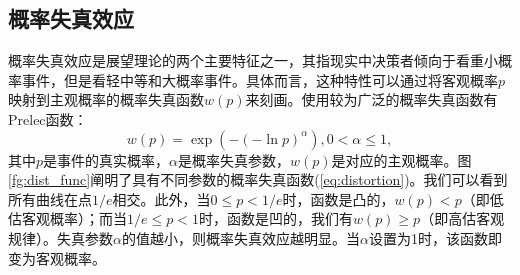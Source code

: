 \subsection{概率失真效应}
概率失真效应是展望理论的两个主要特征之一，其指现实中决策者倾向于看重小概率事件，但是看轻中等和大概率事件。具体而言，这种特性可以通过将客观概率$p$映射到主观概率的概率失真函数$w(p)$来刻画。使用较为广泛的概率失真函数有Prelec函数\cite{Prelec}：
\begin{equation}\label{eq:distortion}
w(p)=\exp(-(-\ln p)^{\alpha}), 0<\alpha\leq 1,
\end{equation}
其中$p$是事件的真实概率，$\alpha$是概率失真参数，$w(p)$是对应的主观概率。图\ref{fg:dist_func}阐明了具有不同参数的概率失真函数(\ref{eq:distortion})。我们可以看到所有曲线在点$1/e$相交。此外，当$0\leq p < 1/e$时，函数是凸的，$w(p)<p$（即低估客观概率）；而当$1/e\leq p<1$时，函数是凹的，我们有$w(p)\geq p$（即高估客观规律）。失真参数$\alpha$的值越小，则概率失真效应越明显。当$\alpha$设置为1时，该函数即变为客观概率。
